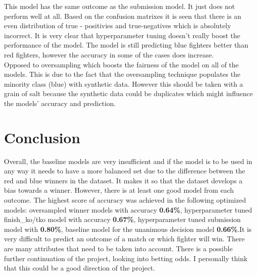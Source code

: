 \documentclass{article}
\begin{document}
	This model has the same outcome as the submission model. It just does not perform well at all. Based on the confusion matrixes it is seen that there is an even distribution of true - positivies and true-negatives which is absolutely incorrect.
	\newpage
	It is very clear that hyperparameter tuning doesn't really boost the performance of the model. The model is still predicting blue fighters better than red fighters, however the accuracy in some of the cases does increase.\\
	Opposed to oversampling which boosts the fairness of the model on all of the models. This is due to the fact that the oversampling technique populates the minority class (blue) with synthetic data. However this should be taken with a grain of salt because the synthetic data could be duplicates which might influence the models' accuracy and prediction.
\section{Conclusion}
Overall, the baseline models are very insufficient and if the model is to be used in any way it needs to have a more balanced set due to the difference between the red and blue winners in the dataset. It makes it so that the dataset develops a bias towards a winner. However, there is at least one good model from each outcome. The highest score of accuracy was achieved in the following optimized models: oversampled winner models with accuracy \textbf{0.64\%}, hyperparameter tuned finish\_ko/tko model with accuracy \textbf{0.67\%}, hyperparameter tuned submission model with \textbf{0.80\%}, baseline model for the unanimous decision model \textbf{0.66\%}.It is very difficult to predict an outcome of a match or which fighter will win. There are many attributes that need to be taken into account. There is a possible further continuation of the project, looking into betting odds. I personally think that this could be a good direction of the project.\\
\end{document}
